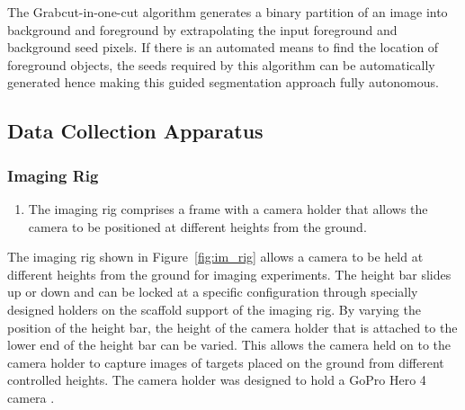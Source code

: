 \documentclass {udthesis}
\begin{document}
The Grabcut-in-one-cut algorithm generates a binary partition of an image into background and foreground by extrapolating the input foreground and background seed pixels. If there is an automated means to find the location of foreground objects, the seeds required by this algorithm can be automatically generated hence making this guided segmentation approach fully autonomous.

\subsection{Data Collection Apparatus}

\subsubsection{Imaging Rig}
\label{sec:imaging_rig}

\begin{enumerate}
	\item The imaging rig comprises a frame with a camera holder that allows the camera to be positioned at different heights from the ground.
\end{enumerate}


The imaging rig shown in Figure~\ref{fig:im_rig} allows a camera to be held at different heights from the ground for imaging experiments. The height bar slides up or down and can be locked at a specific configuration through specially designed holders on the scaffold support of the imaging rig. By varying the position of the height bar, the height of the camera holder that is attached to the lower end of the height bar can be varied. This allows the camera held on to the camera holder to capture images of targets placed on the ground from different controlled heights. The camera holder was designed to hold a GoPro Hero 4 camera \cite{gopro}.
	
\end{document}
